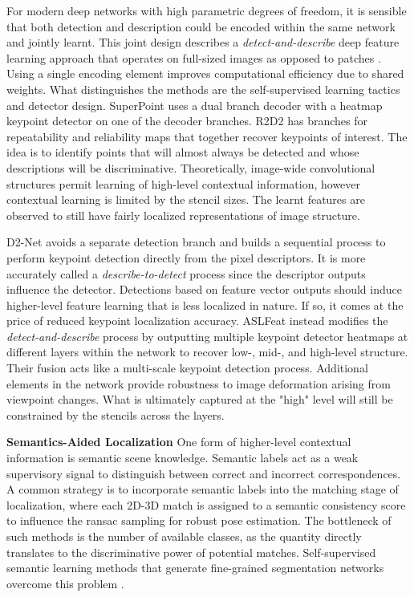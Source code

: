 For modern deep networks with high parametric degrees of freedom, it is sensible that both detection and description could be encoded within the same network and jointly learnt. 
This joint design describes a \textit{detect-and-describe} deep feature learning approach that operates on full-sized images as opposed to patches \cite{detone2018superpoint,revaud2019r2d2,dusmanu2019d2,luo2020aslfeat}.
Using a single encoding element improves computational efficiency due to shared weights. What distinguishes the methods are the self-supervised learning tactics and detector design.
SuperPoint \cite{detone2018superpoint} uses a dual branch decoder with a heatmap keypoint detector on one of the decoder branches. 
R2D2 \cite{revaud2019r2d2} has branches for repeatability and reliability maps that together recover keypoints of interest. 
The idea is to identify points that will almost always be detected and whose descriptions will be discriminative.  
Theoretically, image-wide convolutional structures permit learning of high-level contextual information, however contextual learning is limited by the stencil sizes.  
The learnt features are observed to still have fairly localized representations of image structure. 

D2-Net \cite{dusmanu2019d2} avoids a separate detection branch and builds a sequential process to perform keypoint detection directly from the pixel descriptors.
It is more accurately called a {\em describe-to-detect} process since the descriptor outputs influence the detector. 
Detections based on feature vector outputs should induce higher-level feature learning that is less localized in nature. 
If so, it comes at the price of reduced keypoint localization accuracy. 
ASLFeat \cite{luo2020aslfeat} instead modifies the {\em
detect-and-describe} process by outputting multiple keypoint detector heatmaps at different layers within the network to recover low-, mid-, and high-level structure. 
Their fusion acts like a multi-scale keypoint detection process. 
Additional elements in the network provide robustness to
image deformation arising from viewpoint changes.
What is ultimately captured at the "high" level will still be constrained by the stencils across the layers.

 
\noindent \textbf{Semantics-Aided Localization}
One form of higher-level contextual information is semantic scene knowledge.  
Semantic labels act as a weak supervisory signal to distinguish between correct and incorrect correspondences.  
A common strategy is to incorporate semantic labels into the matching stage of localization, where each 2D-3D match is assigned to a semantic consistency score \cite{toft2018semantic,shi2019visual} to influence the \acrshort{ransac} sampling for robust pose estimation. 
The bottleneck of such methods is the number of available classes, as the quantity directly translates to the discriminative power of potential matches. 
Self-supervised semantic learning methods that generate fine-grained segmentation networks overcome this problem \cite{larsson2019fine}.

